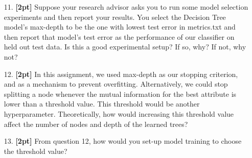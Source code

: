 \documentclass[11pt]{article}
\numberwithin{equation}{section} %
\numberwithin{figure}{section} %
\numberwithin{table}{section} %
\begin{document}
\begin{enumerate}
    \begin{solution}
    \bigskip \bigskip \bigskip \bigskip \bigskip \bigskip \bigskip \bigskip
    \bigskip \bigskip \bigskip \bigskip \bigskip \bigskip \bigskip \bigskip
    \bigskip \bigskip \bigskip \bigskip \bigskip \bigskip \bigskip \bigskip
    \bigskip \bigskip \bigskip \bigskip \bigskip \bigskip \bigskip \bigskip
    \end{solution}
    
\clearpage
    \item[11.] \textbf{[2pt]} Suppose your research advisor asks you to run some model selection experiments and then report your results. You select the Decision Tree model's max-depth to be the one with lowest test error in metrics.txt and then report that model's test error as the performance of our classifier on held out test data. Is this a good experimental setup? If so, why? If not, why not?
    
    \begin{solution}
    \bigskip \bigskip \bigskip \bigskip \bigskip \bigskip \bigskip \bigskip
    \bigskip \bigskip \bigskip \bigskip \bigskip \bigskip \bigskip \bigskip
    \end{solution}
    

    \item[12.] \textbf{[2pt]} In this assignment, we used max-depth as our stopping criterion, and as a mechanism to prevent overfitting. Alternatively, we could stop splitting a node whenever the mutual information for the best attribute is lower than a threshold value. This threshold would be another hyperparameter. Theoretically, how would increasing this threshold value affect the number of nodes and depth of the learned trees?
    
    \begin{solution}
    \bigskip \bigskip \bigskip \bigskip \bigskip \bigskip \bigskip \bigskip
    \bigskip \bigskip \bigskip \bigskip \bigskip \bigskip \bigskip \bigskip
    \end{solution}
    

\clearpage
    \item[13.] \textbf{[2pt]} From question 12, how would you set-up model training to choose the threshold value?
    
    \begin{solution}
    \bigskip \bigskip \bigskip \bigskip \bigskip \bigskip \bigskip \bigskip
    \bigskip \bigskip \bigskip \bigskip \bigskip \bigskip \bigskip \bigskip
    \end{solution}
    

\end{enumerate}
\end{document}
